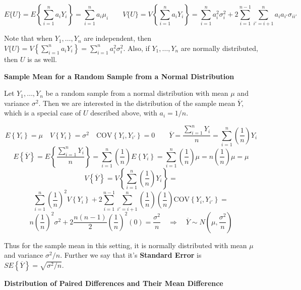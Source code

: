 \documentclass[
]{book}
\begin{document}
\[
E\{U\} = E\left\{\sum_{i=1}^na_iY_i\right\}=\sum_{i=1}^na_i\mu_i  \qquad
V\{U\}=V\left\{\sum_{i=1}^na_iY_i\right\}=\sum_{i=1}^na_i^2\sigma_i^2+
2\sum_{i=1}^{n-1}\sum_{i'=i+1}^na_ia_{i'}\sigma_{ii'}
\]

Note that when \(Y_1,\ldots,Y_n\) are independent, then
\(V\{U\}=V\left\{\sum_{i=1}^na_iY_i\right\}=\sum_{i=1}^na_i^2\sigma_i^2\).
Also, if \(Y_1,\ldots,Y_n\) are normally distributed, then \(U\) is as
well.

\textbf{Sample Mean for a Random Sample from a Normal Distribution}

Let \(Y_1,\ldots,Y_n\) be a random sample from a normal distribution
with mean \(\mu\) and variance \(\sigma^2\). Then we are interested in
the distribution of the sample mean \(\overline{Y}\), which is a special
case of \(U\) described above, with \(a_i=1/n\).

\[
E\left\{Y_i\right\}=\mu \quad V\left\{Y_i\right\}=\sigma^2 \quad
\mbox{COV}\left\{Y_i,Y_{i'}\right\}=0 \qquad
\overline{Y}=\frac{\sum_{i=1}^nY_i}{n}=\sum_{i=1}^n\left(\frac{1}{n}\right)Y_i 
\] \[
 E\left\{\overline{Y}\right\}=
E\left\{\frac{\sum_{i=1}^nY_i}{n}\right\}=
\sum_{i=1}^n\left(\frac{1}{n}\right)E\left\{Y_i\right\}=
\sum_{i=1}^n\left(\frac{1}{n}\right)\mu=
n\left(\frac{1}{n}\right)\mu=\mu
\] \[
V\left\{\overline{Y}\right\}=
V\left\{\sum_{i=1}^n\left(\frac{1}{n}\right)Y_i\right\}=
\] \[
\sum_{i=1}^n\left(\frac{1}{n}\right)^2V\left\{Y_i\right\}+
2\sum_{i=1}^{n-1}\sum_{i'=i+1}^n\left(\frac{1}{n}\right)\left(\frac{1}{n}\right)
\mbox{COV}\left\{Y_i,Y_{i'}\right\}=
\] \[
n\left(\frac{1}{n}\right)^2\sigma^2+2\frac{n(n-1)}{2}\left(\frac{1}{n}\right)^2(0)=
\frac{\sigma^2}{n}  \quad \Rightarrow \quad 
\overline{Y} \sim N\left(\mu,\frac{\sigma^2}{n}\right)
\]

Thus for the sample mean in this setting, it is normally distributed
with mean \(\mu\) and variance \(\sigma^2/n\). Further we say that it's
\textbf{Standard Error} is
\(SE\left\{\overline{Y}\right\}=\sqrt{\sigma^2/n}\).

\textbf{Distribution of Paired Differences and Their Mean Difference}
\end{document}

